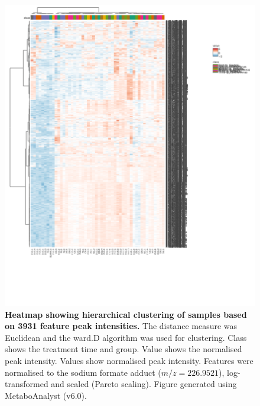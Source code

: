 \begin{figure}[htp!]
    \centering
    \includegraphics[width=\textwidth]{Figures/AllFeaturesAllSamples_Clustered.png}
    \caption[Heatmap showing hierarchical clustering of samples based on feature peak intensities.]{\textbf{Heatmap showing hierarchical clustering of samples based on 3931 feature peak intensities.} The distance measure was Euclidean and the ward.D algorithm was used for clustering. Class shows the treatment time and group. Value shows the normalised peak intensity. Values show normalised peak intensity. Features were normalised to the sodium formate  adduct ($m/z=226.9521$), log-transformed and scaled (Pareto scaling). Figure generated using MetaboAnalyst (v6.0).}
    \label{fig:AllFeaturesAllSamples}
\end{figure}

